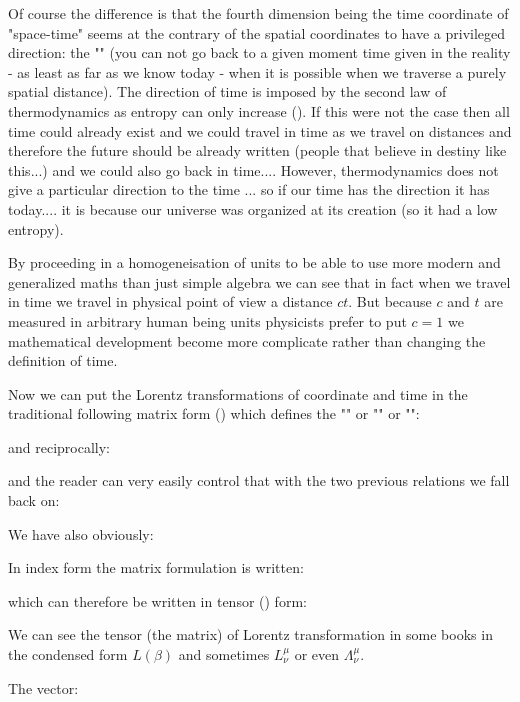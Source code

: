 	Of course the difference is that the fourth dimension being the time coordinate of "space-time" seems at the contrary of the spatial coordinates to have a privileged direction: the "" (you can not go back to a given moment time given in the reality - as least as far as we know today - when it is possible when we traverse a purely spatial distance). The direction of time is imposed by the second law of thermodynamics as entropy can only increase (). If this were not the case then all time could already exist and we could travel in time as we travel on distances and therefore the future should be already written (people that believe in destiny like this...) and we could also go back in time.... However, thermodynamics does not give a particular direction to the time ... so if our time has the direction it has today.... it is because our universe was organized at its creation (so it had a low entropy).
	
	By proceeding in a homogeneisation of units to be able to use more modern and generalized maths than just simple algebra we can see that in fact when we travel in time we travel in physical point of view a distance $ct$. But because $c$ and $t$ are measured in arbitrary human being units physicists prefer to put $c=1$ we mathematical development become more complicate rather than changing the definition of time.
	
	Now we can put the Lorentz transformations of coordinate and time in the traditional following matrix form () which defines the "" or "" or "\label{lorentz boost tensor}":
	
	and reciprocally:
	
	and the reader can very easily control that with the two previous relations we fall back on:
	
	We have also obviously:
	
	In index form the matrix formulation is written:
	
	which can therefore be written in tensor () form:
	
	\begin{tcolorbox}[title=Remark,colframe=black,arc=10pt]
	We can see the tensor (the matrix) of Lorentz transformation in some books in the condensed form $L(\beta)$ and sometimes $L_\nu^\mu$ or even $\Lambda_\nu^\mu$.
	\end{tcolorbox}
	The vector\label{four-vector displacement}:
	
